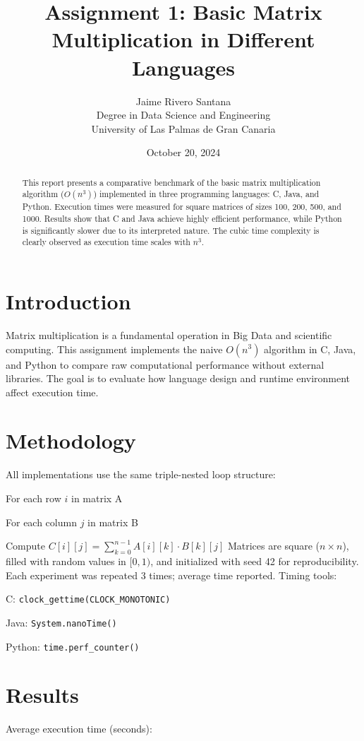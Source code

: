 \documentclass[12pt]{article}
\title{Assignment 1: Basic Matrix Multiplication in Different Languages}
\author{Jaime Rivero Santana \\ Degree in Data Science and Engineering \\ University of Las Palmas de Gran Canaria}
\date{October 20, 2024}
\begin{document}
\maketitle

\begin{abstract}
This report presents a comparative benchmark of the basic matrix multiplication algorithm ($O(n^3)$) implemented in three programming languages: C, Java, and Python. Execution times were measured for square matrices of sizes 100, 200, 500, and 1000. Results show that C and Java achieve highly efficient performance, while Python is significantly slower due to its interpreted nature. The cubic time complexity is clearly observed as execution time scales with $n^3$.
\end{abstract}

\section{Introduction}
Matrix multiplication is a fundamental operation in Big Data and scientific computing. This assignment implements the naive $O(n^3)$ algorithm in C, Java, and Python to compare raw computational performance without external libraries. The goal is to evaluate how language design and runtime environment affect execution time.

\section{Methodology}
All implementations use the same triple-nested loop structure:
\item For each row $i$ in matrix A
    \item For each column $j$ in matrix B
    \item Compute $C[i][j] = \sum_{k=0}^{n-1} A[i][k] \cdot B[k][j]$
Matrices are square ($n \times n$), filled with random values in $[0, 1)$, and initialized with seed 42 for reproducibility. Each experiment was repeated 3 times; average time reported. Timing tools:
\item C: \texttt{clock\_gettime(CLOCK\_MONOTONIC)}
    \item Java: \texttt{System.nanoTime()}
    \item Python: \texttt{time.perf\_counter()}

\section{Results}
Average execution time (seconds):
\end{document}
